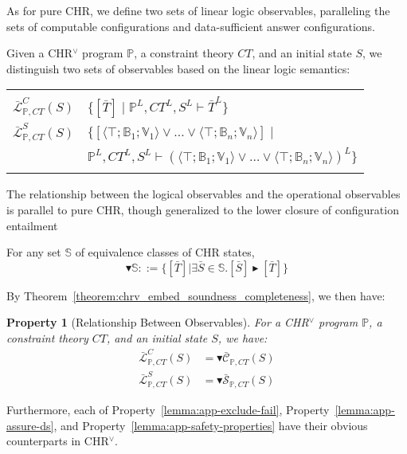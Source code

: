 \documentclass[acmtocl]{acmtrans2m}
\newtheorem{property}[theorem]{Property}
\newcommand\state[1]{\langle #1 \rangle}
\newcommand\entv{\blacktriangleright}
\newcommand{\bbP}{\ensuremath{\mathbb{P}}}
\newcommand{\bbS}{\ensuremath{\mathbb{S}}}
\newcommand{\B}{\ensuremath{\mathbb{B}}}
\newcommand{\V}{\ensuremath{\mathbb{V}}}
\newcommand{\bcS}{\ensuremath{\bar{\mathcal{S}}}}
\newcommand{\bcC}{\ensuremath{\bar{\mathcal{C}}}}
\newcommand{\bcL}{\ensuremath{\bar{\mathcal{L}}}}
\newcommand{\bS}{\bar{S}}
\newcommand{\bT}{\bar{T}}
\begin{document}
As for pure CHR, we define two sets of linear logic observables, paralleling
the sets of computable configurations and data-sufficient answer configurations.

\begin{definition}
Given a CHR$^\vee$ program $\bbP$, a constraint theory $CT$, and an initial
state $S$, we distinguish two sets of observables based on the linear logic
semantics:

\begin{tabular}{r @{\,$::=$} l}
	\multicolumn{2}{c}{}\\
	$\bcL^C_{\bbP,CT}(S)$ &
		$\{[\bT]\mid \bbP^L,CT^L,S^L\vdash \bT^L\}$\\
	$\bcL^S_{\bbP,CT}(S)$ &
		$\{[\state{\top;\B_1;\V_1}\vee\ldots\vee\state{\top;\B_n;\V_n}]\mid$ \\
	\multicolumn{1}{c}{} & \quad
		$\bbP^L,CT^L,S^L\vdash(\state{\top;\B_1;\V_1}\vee\ldots\vee\state{\top;\B_n;\V_n})^L\}$\\
	\multicolumn{2}{c}{}\\
\end{tabular}
\end{definition}

The relationship between the
logical observables and the operational
observables is parallel to pure CHR, though generalized to the
lower closure of configuration entailment

\begin{definition}[Lower Closure of $\entv$]
For any set $\bbS$ of equivalence classes of CHR states,
\[
	\blacktriangledown\bbS ::= \{[\bT]|\exists \bS\in\bbS.[\bS]\entv[\bT]\}
\]
\end{definition}

By Theorem~\ref{theorem:chrv_embed_soundness_completeness}, we then have:

\begin{property}[Relationship Between Observables]
For a CHR$^\vee$ program $\bbP$, a constraint theory $CT$, and an initial
state $S$, we have:
\begin{align*}
	\bcL_{\bbP,CT}^C(S) & = \blacktriangledown\bcC_{\bbP,CT}(S) \\
	\bcL_{\bbP,CT}^S(S) & = \blacktriangledown\bcS_{\bbP,CT}(S)
\end{align*}
\end{property}

Furthermore, each of Property~\ref{lemma:app-exclude-fail},
Property~\ref{lemma:app-assure-ds}, and
Property~\ref{lemma:app-safety-properties} have their obvious
counterparts in CHR$^\vee$.
\end{document}
